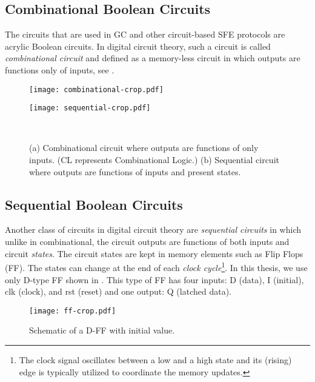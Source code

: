 \subsection{Combinational Boolean Circuits}\label{ssec:prelim-comb}
The circuits that are used in GC and other circuit-based SFE protocols are acrylic Boolean circuits.
In digital circuit theory, such a circuit is called \emph{combinational circuit} and defined as a memory-less circuit in which outputs are functions only of inputs, see .

\begin{figure}[ht]
    \centering
    \begin{minipage}[t]{0.35\textwidth}
        \texttt{[image: combinational-crop.pdf]}
        \label{fig:combinational}
    \end{minipage}
    \begin{minipage}[t]{0.30\textwidth}
        \texttt{[image: sequential-crop.pdf]}
        \label{fig:sequential}
    \end{minipage}\\
    \caption{(a) Combinational circuit where outputs are functions of only inputs. (CL represents Combinational Logic.)
    (b) Sequential circuit where outputs are functions of inputs and present states.
    }\label{fig:combinational-sequential}
\end{figure}

\subsection{Sequential Boolean Circuits}\label{ssec:prelim-seq}
Another class of circuits in digital circuit theory are \emph{sequential circuits} in which unlike in combinational, the circuit outputs are functions of both inputs and circuit \emph{states}.
The circuit states are kept in memory elements such as Flip Flops (FF).
The states can change at the end of each \emph{clock cycle}\footnote{The clock signal oscillates between a low and a high state and its (rising) edge is typically utilized to coordinate the memory updates.}.
In this thesis, we use only D-type FF shown in .
This type of FF has four inputs: D (data), I (initial), clk (clock), and rst (reset) and one output: Q (latched data).

\begin{figure}[ht]
    \centering
	\texttt{[image: ff-crop.pdf]}
	\caption{Schematic of a D-FF with initial value.}
	\label{fig:ff}
\end{figure}

